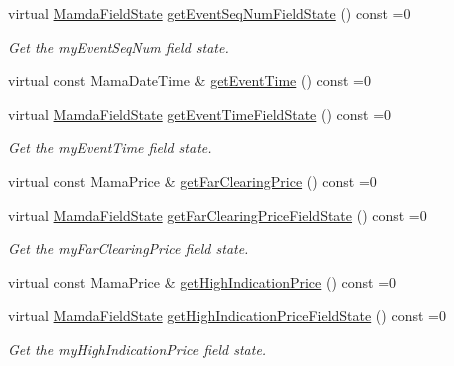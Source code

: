 \begin{CompactItemize}
virtual \hyperlink{namespaceWombat_93aac974f2ab713554fd12a1fa3b7d2a}{Mamda\-Field\-State} \hyperlink{classWombat_1_1MamdaOrderImbalanceRecap_09091e1441752ff0aaed931532d6fb7d}{get\-Event\-Seq\-Num\-Field\-State} () const =0
\begin{CompactList}\small\item\em Get the my\-Event\-Seq\-Num field state. \item\end{CompactList}\item 
virtual const Mama\-Date\-Time \& \hyperlink{classWombat_1_1MamdaOrderImbalanceRecap_7ee6f3e229298d61cb56b5780795303b}{get\-Event\-Time} () const =0
\item 
virtual \hyperlink{namespaceWombat_93aac974f2ab713554fd12a1fa3b7d2a}{Mamda\-Field\-State} \hyperlink{classWombat_1_1MamdaOrderImbalanceRecap_5a99f2d259050eb8aa9e014ff7bb69de}{get\-Event\-Time\-Field\-State} () const =0
\begin{CompactList}\small\item\em Get the my\-Event\-Time field state. \item\end{CompactList}\item 
virtual const Mama\-Price \& \hyperlink{classWombat_1_1MamdaOrderImbalanceRecap_0ca93b87f7f9e0dcf21db29dfced88f7}{get\-Far\-Clearing\-Price} () const =0
\item 
virtual \hyperlink{namespaceWombat_93aac974f2ab713554fd12a1fa3b7d2a}{Mamda\-Field\-State} \hyperlink{classWombat_1_1MamdaOrderImbalanceRecap_dce3165730870835e74d2fb704965cad}{get\-Far\-Clearing\-Price\-Field\-State} () const =0
\begin{CompactList}\small\item\em Get the my\-Far\-Clearing\-Price field state. \item\end{CompactList}\item 
virtual const Mama\-Price \& \hyperlink{classWombat_1_1MamdaOrderImbalanceRecap_1d1c151048651f612b924b30d378db9f}{get\-High\-Indication\-Price} () const =0
\item 
virtual \hyperlink{namespaceWombat_93aac974f2ab713554fd12a1fa3b7d2a}{Mamda\-Field\-State} \hyperlink{classWombat_1_1MamdaOrderImbalanceRecap_7515d1c6c386cc1e68039922968fdb9d}{get\-High\-Indication\-Price\-Field\-State} () const =0
\begin{CompactList}\small\item\em Get the my\-High\-Indication\-Price field state. \item\end{CompactList}\item 

\end{CompactItemize}
